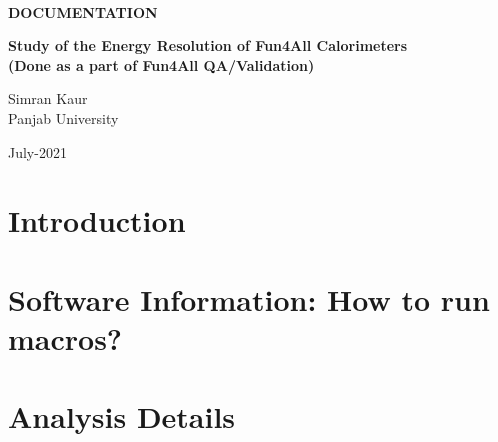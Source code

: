 \documentclass{article}
\begin{document}
\begin{titlepage}
	\clearpage\thispagestyle{empty}
	\centering
	\vspace{1cm}

	{\normalsize \textbf{\textit{}} \\ 
		 \par}
		\vspace{5.5cm}
	{\Huge \textbf{DOCUMENTATION}} \\
	\vspace{0.6cm}
	{\huge \textbf{Study of the Energy Resolution of Fun4All Calorimeters \\(Done as a part of Fun4All QA/Validation)} \par}
	\vspace{4.3cm}
	{\Large Simran Kaur \\ 
	             Panjab University\par}
	\vspace{2.6cm}
	{\normalsize July-2021 \par}
	
	\pagebreak

\end{titlepage}

\tableofcontents
\cleardoublepage


\section{Introduction}

\section{Software Information: How to run macros?}

\section{Analysis Details}
\end{document}
